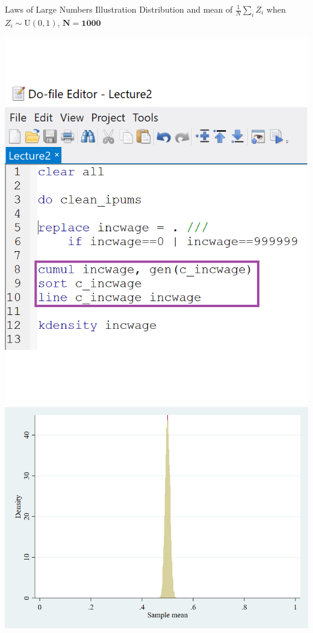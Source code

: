 \documentclass[11pt,handout,aspectratio=169]{beamer}
\begin{document}
\begin{frame}{Laws of Large Numbers Illustration}
	\vspace{0.2cm}
	Distribution and mean of $\frac{1}{N}\sum_i Z_i$ when $Z_i\sim \mathrm{U}(0,1)$, $\mathbf{N=1000}$
	
	\begin{center}
		\includegraphics[scale=0.4]{Stata8.png} \includegraphics[scale=0.25]{sims1000_2.png}
	\end{center}
	
\end{frame}
\end{document}
